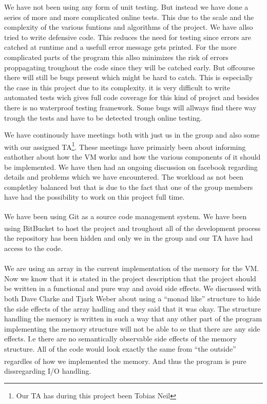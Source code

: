 \documentclass{article}
\begin{document}
We have not been using any form of unit testing. But instead we have done a
series of more and more complicated online tests. This due to the scale and the
complexity of the various funtions and algorithms of the project. We have allso
tried to write defensive code. This reduces the need for testing since errors
are catched at runtime and a usefull error message gets printed. For the more
complicated parts of the program this allso minimizes the risk of errors
proppagating troughout the code since they will be catched early. But offcourse
there will still be bugs present which might be hard to catch. This is
especially the case in this project due to its complexity. it is very difficult
to write automated tests wich gives full code coverage for this kind of project
and besides there is no waterproof testing framework. Some bugs will allways
find there way trough the tests and have to be detected trough online testing.

We have continously have meetings both with just us in the group and also some
with our assigned TA\footnote{Our TA has during this project been Tobias Neil}.
These meetings have primairly been about informing eathother about how the
VM works and how the various components of it should be
implemented. We have then had an ongoing discussion on facebook regarding
details and problems which we have encountered. The workload as not been
completley balanced but that is due to the fact that one of the group members
have had the possibility to work on this project full time.

We have been using Git\textsuperscript{\cite{git}} as a source code management
system. We have been using BitBucket\textsuperscript{\cite{bitbucket}} to
host the project and troughout all of the development process the repository has
been hidden and only we in the group and our TA have had access to the code.\\
\\
We are using an array in the current implementation of the memory for the VM.
Now we know that it is stated in the project description that the project should
be written in a functional and pure way and avoid side effects. We discussed
with both Dave Clarke and Tjark Weber about using a ``monad like'' structure
to hide the side effects of the array hadling and they said that it was okay.
The structure handling the memory is written in such a way that any other part
of the program implementing the memory structure will not be able to se that there
are any side effects. I.e there are no semantically observable side effects of
the memory structure. All of the code would look exactly the same from ``the
outside'' regardles of how we implemented the memory. And thus the program is
pure\textsuperscript{\cite{pure}} dissregarding I/O handling.
\end{document}

